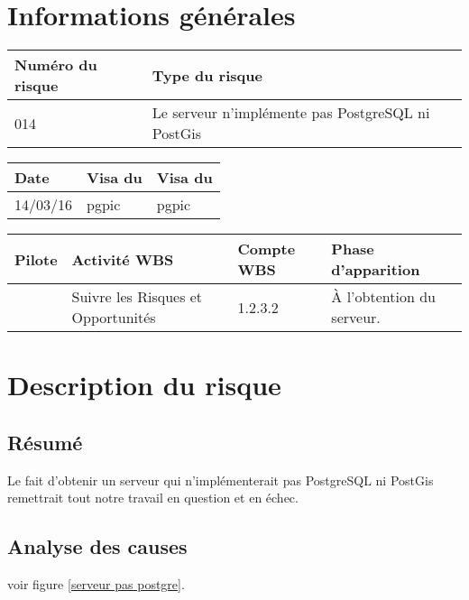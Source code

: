 
\section*{Informations générales}

\begin{table}[H]
\centering
	\begin{tabularx}{16.8cm}{|X|X|}
	\hline
	\rowcolor{gray!40} Numéro du risque & Type du risque \\
	\hline
	014 & Le serveur n’implémente pas PostgreSQL ni PostGis \\
	\hline
	\end{tabularx}
\end{table}

\begin{table}[H]
\centering
	\begin{tabularx}{16.8cm}{|X|X|X|}
	\hline
	\rowcolor{gray!40} Date & Visa du \RQ & Visa du \CP \\
	\hline
	 14/03/16 & pgpic & pgpic \\
	\hline
	\end{tabularx}
\end{table}

\begin{table}[H]
\centering
	\begin{tabularx}{16.8cm}{|X|X|X|X|}
	\hline
	\rowcolor{gray!40} Pilote & Activité WBS & Compte WBS & Phase d'apparition \\
	\hline
	 \Sergi & Suivre les Risques et Opportunités & 1.2.3.2 & À l'obtention du serveur. \\
	\hline
	\end{tabularx}
\end{table}

\section*{Description du risque}

\subsection*{Résumé}
	Le fait d'obtenir un serveur qui n’implémenterait pas PostgreSQL ni PostGis remettrait tout notre travail en question et en échec.
	
\subsection*{Analyse des causes}
	voir figure \ref{serveur pas postgre}.

